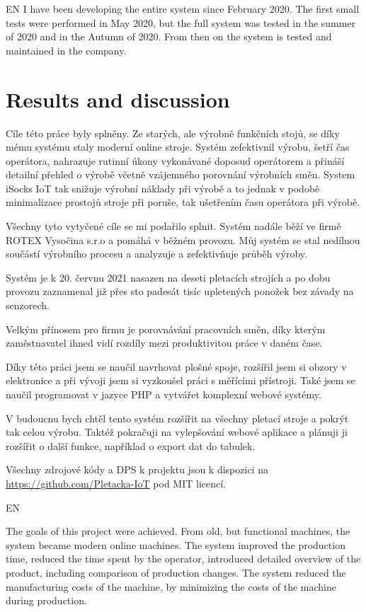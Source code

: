 \documentclass[12pt, a4paper]{article}
\begin{document}
EN
I have been developing the entire system since February 2020.
The first small tests were performed in May 2020, but the full system was tested in the summer of 2020 and in the Autumn of 2020.
From then on the system is tested and maintained in the company.


\newpage
\section*{Results and discussion}


Cíle této práce byly splněny. Ze starých, ale výrobně funkčních stojů, se díky mému systému staly moderní online stroje.
Systém zefektivnil výrobu, šetří čas operátora, nahrazuje rutinní úkony vykonávané doposud operátorem a přináší detailní přehled o výrobě včetně vzájemného porovnání výrobních směn.
System iSocks IoT tak snižuje výrobní náklady při výrobě a to jednak v podobě minimalizace prostojů stroje při poruše, tak ušetřením času operátora při výrobě.


Všechny tyto vytyčené cíle se mi podařilo splnit.
Systém nadále běží ve firmě ROTEX Vysočina s.r.o a pomáhá v běžném provozu.
Můj systém se stal nedílnou součástí výrobního procesu a analyzuje a zefektivňuje průběh výroby.

Systém je k 20. červnu 2021 nasazen na deseti pletacích strojích a po dobu provozu zaznamenal již přes sto padesát tisíc upletených ponožek bez závady na senzorech.

Velkým přínosem pro firmu je porovnávání pracovních směn, díky kterým zaměstnavatel ihned vidí rozdíly mezi produktivitou práce v daném čase.

Díky této práci jsem se naučil navrhovat plošné spoje, rozšířil jsem si obzory v elektronice a při vývoji jsem si vyzkoušel práci s měřícími přístroji.
Také jsem se naučil programovat v jazyce PHP a vytvářet komplexní webové systémy.

V budoucnu bych chtěl tento systém rozšířit na všechny pletací stroje a pokrýt tak celou výrobu.
Taktéž pokračuji na vylepšování webové aplikace a plánuji ji rozšířit o další funkce, například o export dat do tabulek.

Všechny zdrojové kódy a DPS k projektu jsou k dispozici na \url{https://github.com/Pletacka-IoT} pod MIT licencí.

EN

The goals of this project were achieved. From old, but functional machines, the system became modern online machines.
The system improved the production time, reduced the time spent by the operator, introduced detailed overview of the product, including comparison of production changes.
The system reduced the manufacturing costs of the machine, by minimizing the costs of the machine during production.
\end{document}
